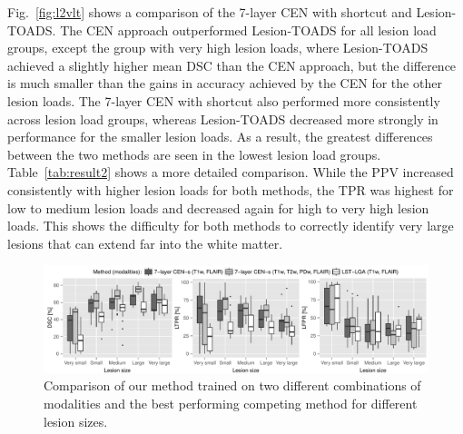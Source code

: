 
Fig.~\ref{fig:l2vlt} shows a comparison of the 7-layer CEN with shortcut and
Lesion-TOADS. The CEN approach outperformed Lesion-TOADS for all lesion load
groups, except the group with very high lesion loads, where Lesion-TOADS
achieved a slightly higher mean DSC than the CEN approach, but the difference is
much smaller than the gains in accuracy achieved by the CEN for the other lesion
loads. The 7-layer CEN with shortcut also performed more consistently across
lesion load groups, whereas Lesion-TOADS decreased more strongly in performance
for the smaller lesion loads. As a result, the greatest differences between the
two methods are seen in the lowest lesion load groups.
Table~\ref{tab:result2} shows a more detailed
comparison. While the PPV increased consistently with higher lesion loads for
both methods, the TPR was highest for low to medium lesion loads and decreased
again for high to very high lesion loads. This shows the difficulty for both
methods to correctly identify very large lesions that can extend far into the
white matter.

\begin{figure}
\centering
\includegraphics[width=\textwidth]{figures/cen_vs_LGA_size}
\caption{Comparison of our method trained on two different combinations of
modalities and the best performing competing method for different lesion sizes.}
\end{figure}


